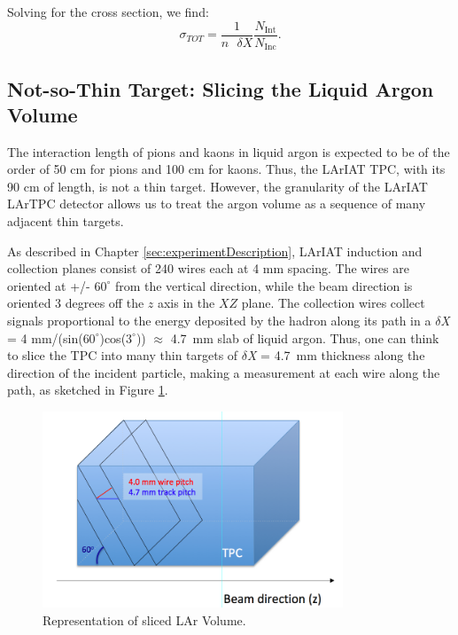 Solving for the cross section, we find:
\begin{equation}
 \sigma_{TOT}  = \frac{1}{n \text{ }\delta X}\frac{N_{\text{Int}}}{N_{\text{Inc}}}.
\label{eq:thinTargetXSSolved}
\end{equation}

\subsection{Not-so-Thin Target: Slicing the Liquid Argon Volume}\label{ch:XSRaw}
The interaction length of pions and kaons in liquid argon is expected to be of the order of 50 cm for pions and 100 cm for kaons. Thus, the LArIAT TPC, with its 90 cm of length, is not a thin target. However, the granularity of the LArIAT LArTPC detector allows us to treat the argon volume as a sequence of many adjacent thin targets. 

As described in Chapter \ref{sec:experimentDescription}, LArIAT induction and collection planes consist of 240 wires each at 4 mm spacing. The wires are oriented at +/- $60^{\circ}$ from the vertical direction, while the beam direction is oriented 3 degrees off the $z$ axis in the $XZ$ plane.  The collection wires collect signals proportional to the energy deposited by the hadron along its path in a  $\delta${\emph{X}} = 4 mm/(sin($60^{\circ}$)cos($3^{\circ}$)) $\approx$ 4.7~mm slab of liquid argon. Thus, one can think to slice the TPC into many thin targets of $\delta${\emph{X}} = 4.7~mm thickness along the direction of the incident particle, making a measurement at each wire along the path, as sketched in Figure \ref{fig:TPCGran}.

\begin{figure}
  \centering  
\includegraphics[width=0.8\textwidth]{Chapter-4/Images/LArSlice.png}
\caption{Representation of sliced LAr Volume.}
\label{fig:TPCGran}
\end{figure}


